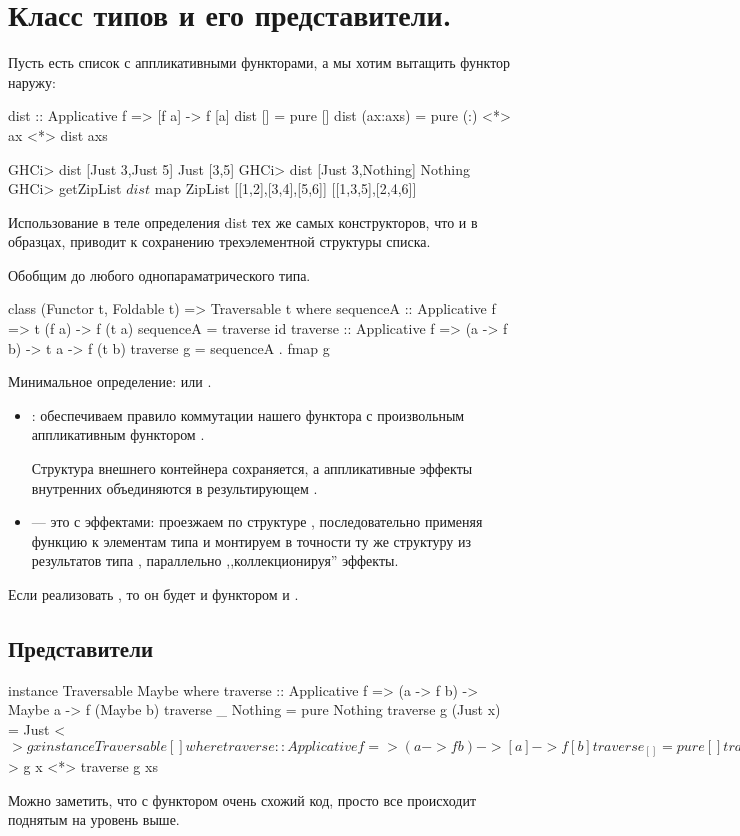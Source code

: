\documentclass[11pt,a4paper]{article}
\begin{document}
\section{Класс типов  и его представители.}
Пусть есть список с аппликативными функторами, а мы хотим вытащить функтор наружу:
\begin{hscode}
dist :: Applicative f => [f a] -> f [a]
dist [] = pure []
dist (ax:axs) = pure (:) <*> ax <*> dist axs

GHCi> dist [Just 3,Just 5]
Just [3,5]
GHCi> dist [Just 3,Nothing]
Nothing
GHCi> getZipList $ dist $ map ZipList [[1,2],[3,4],[5,6]]
[[1,3,5],[2,4,6]]
\end{hscode}
Использование в теле определения dist тех же самых
конструкторов, что и в образцах, приводит к сохранению
трехэлементной структуры списка.

Обобщим до любого однопараматрического типа.
\begin{hscode}
class (Functor t, Foldable t) => Traversable t where
	sequenceA :: Applicative f => t (f a) -> f (t a)
	sequenceA = traverse id
	traverse :: Applicative f => (a -> f b) -> t a -> f (t b)
	traverse g = sequenceA . fmap g
\end{hscode}
Минимальное определение:  или .
\begin{itemize}
	\item {}: обеспечиваем правило коммутации нашего функтора  с произвольным аппликативным функтором .

		Структура внешнего контейнера  сохраняется, а аппликативные эффекты внутренних  объединяются в результирующем .
	\item 
		 --- это  с эффектами: проезжаем по структуре , последовательно применяя функцию к элементам типа  и монтируем в точности ту же структуру из результатов типа , параллельно ,,коллекционируя'' эффекты.
\end{itemize}
Если реализовать , то он будет и функтором и .
\subsection{Представители}
\begin{hscode}
instance Traversable Maybe where
	traverse :: Applicative f => (a -> f b) -> Maybe a -> f (Maybe b)
	traverse _ Nothing = pure Nothing
	traverse g (Just x) = Just <$> g x

instance Traversable [] where
	traverse :: Applicative f => (a -> f b) -> [a] -> f [b]
	traverse _ [] = pure []
	traverse g (x:xs) = (:) <$> g x <*> traverse g xs
\end{hscode}
Можно заметить, что с функтором очень схожий код, просто все происходит поднятым на уровень выше.
\end{document}
